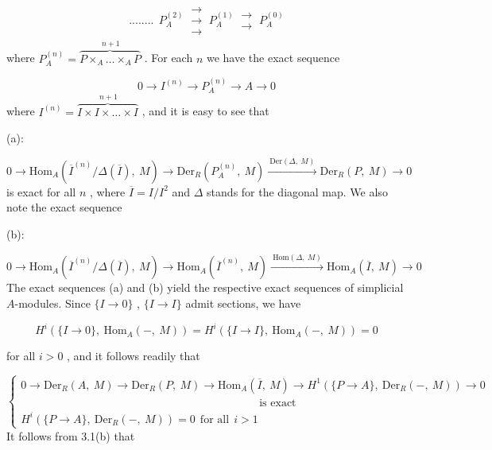 \begin{multline}\tag{*}
........\ \ P_A^{(2)} \ \mathrel{\substack{\to\\ \to\\ \to}} \ P_A^{(1)} \ \mathrel{\substack{\to\\ \to}} \ P_A^{(0)}
\end{multline}
where  $P_A^{(n)} = \overbrace{P\times_A \ldots \times_A P}^{\,n+1}$  . For each  $n$  we have the exact sequence

\begin{equation*}
0 \to I^{(n)} \to P_A^{(n)} \to A \to 0
\end{equation*}
where  $I^{(n)} = \overbrace{I\times I\times \ldots \times I}^{\,n+1}$  , and it is easy to see that

(a):

\begin{equation*}
0 \to \mathrm{Hom}_A(\overline{I}^{(n)}/\Delta(\overline{I}),\ M) \to \mathrm{Der}_R(P_A^{(n)},\ M) \xrightarrow{\ \mathrm{Der}(\Delta,\ M)\ } \mathrm{Der}_R(P,\ M) \to 0
\end{equation*}
is exact for all  $n$  , where  $\overline{I} = I/I^2$  and  $\Delta$  stands for the diagonal map. We also note the exact sequence

(b):

\begin{equation*}
0 \to \mathrm{Hom}_A(\overline{I}^{(n)}/\Delta(\overline{I}),\ M) \to \mathrm{Hom}_A(\overline{I}^{(n)},\ M) \xrightarrow{\ \mathrm{Hom}(\Delta,\ M)\ } \mathrm{Hom}_A(\overline{I},\ M) \to 0
\end{equation*}
The exact sequences (a) and (b) yield the respective exact sequences of simplicial $A$-modules. Since  $\{I \to 0\}$ , $\{I \to I\}$  admit sections, we have

\begin{equation*}
H^i(\{I \to 0\},\ \mathrm{Hom}_A(-,\ M)) = H^i(\{I \to I\},\ \mathrm{Hom}_A(-,\ M)) = 0 
\end{equation*}


 for all  $i > 0$  , and it follows readily that

\begin{equation*}
\left\{\begin{array}{l}
0 \to \mathrm{Der}_R(A,\ M) \to \mathrm{Der}_R(P,\ M) \to \mathrm{Hom}_A(\overline{I},\ M) \to H^1(\{P \to A\},\ \mathrm{Der}_R(-,\ M)) \to 0 \\[4pt]
\hspace{9cm}\text{is exact} \\[4pt]
H^i(\{P \to A\},\ \mathrm{Der}_R(-,\ M)) = 0 \ \ \text{for all} \ \ i > 1
\end{array}\right.
\end{equation*}
It follows from 3.1(b) that


